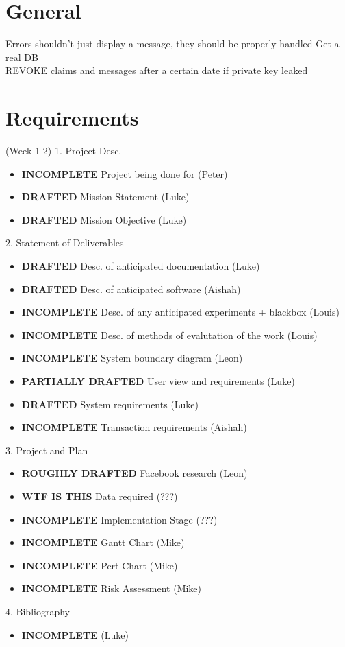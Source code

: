\section{General}
Errors shouldn't just display a message, they should be properly handled
Get a real DB\\
REVOKE claims and messages after a certain date if private key leaked\\

\section{Requirements} (Week 1-2)
1. Project Desc.
\begin{itemize}
\item \textbf{INCOMPLETE} Project being done for (Peter)
\item \textbf{DRAFTED} Mission Statement (Luke)
\item \textbf{DRAFTED} Mission Objective (Luke)
\end{itemize}

2. Statement of Deliverables
\begin{itemize}
\item \textbf{DRAFTED} Desc. of anticipated documentation (Luke)
\item \textbf{DRAFTED} Desc. of anticipated software (Aishah)
\item \textbf{INCOMPLETE} Desc. of any anticipated experiments + blackbox (Louis)
\item \textbf{INCOMPLETE} Desc. of methods of evalutation of the work (Louis)
\item \textbf{INCOMPLETE} System boundary diagram (Leon)
\item \textbf{PARTIALLY DRAFTED} User view and requirements (Luke)
\item \textbf{DRAFTED} System requirements (Luke)
\item \textbf{INCOMPLETE} Transaction requirements (Aishah)
\end{itemize}

3. Project and Plan
\begin{itemize}
\item \textbf{ROUGHLY DRAFTED} Facebook research (Leon)
\item \textbf{WTF IS THIS} Data required (???)
\item \textbf{INCOMPLETE} Implementation Stage (???)
\item \textbf{INCOMPLETE} Gantt Chart (Mike)
\item \textbf{INCOMPLETE} Pert Chart (Mike)
\item \textbf{INCOMPLETE} Risk Assessment (Mike)
\end{itemize}

4. Bibliography
\begin{itemize}
\item \textbf{INCOMPLETE} (Luke)
\end{itemize}
